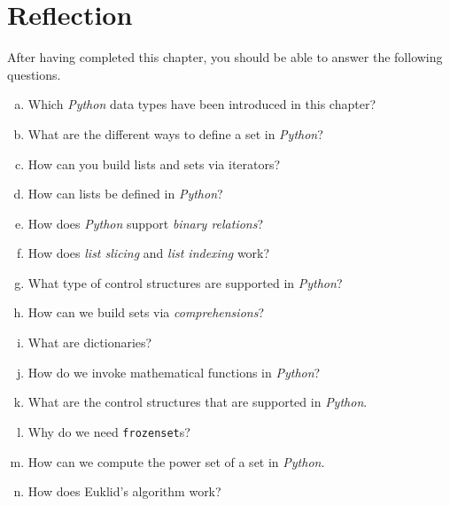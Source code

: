 \section{Reflection}
After having completed this chapter, you should be able to answer the following questions.
\begin{enumerate}[(a)]
\item Which \textsl{Python} data types have been introduced in this chapter?
\item What are the different ways to define a set in \textsl{Python}?
\item How can you build lists and sets via iterators? 
\item How can lists be defined in \textsl{Python}?
\item How does \textsl{Python} support \emph{binary relations}?
\item How does \emph{list slicing} and \emph{list indexing} work?
\item What type of control structures are supported in \textsl{Python}?
\item How can we build sets via \emph{comprehensions}?
\item What are dictionaries?
\item How do we invoke mathematical functions in \textsl{Python}?
\item What are the control structures that are supported in \textsl{Python}.
\item Why do we need \texttt{frozenset}s?
\item How can we compute the power set of a set in \textsl{Python}.
\item How does Euklid's algorithm work?  
\end{enumerate}


